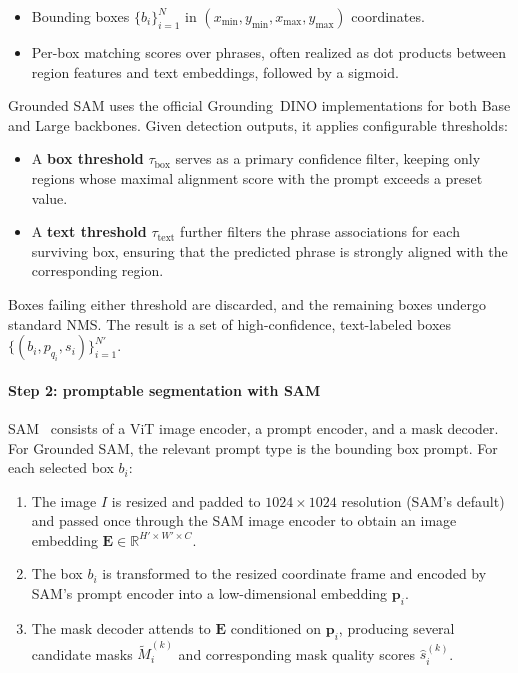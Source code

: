 \begin{enrichment}
\begin{enrichment}
		\begin{itemize}
			\item Bounding boxes $\{b_i\}_{i=1}^{N}$ in $(x_{\min}, y_{\min}, x_{\max}, y_{\max})$ coordinates.
			\item Per-box matching scores over phrases, often realized as dot products between region features and text embeddings, followed by a sigmoid.
		\end{itemize}
		
		Grounded SAM uses the official Grounding~DINO implementations for both Base and Large backbones.
		Given detection outputs, it applies configurable thresholds:
		
		\begin{itemize}
			\item A \textbf{box threshold} $\tau_{\text{box}}$ serves as a primary confidence filter, keeping only regions whose maximal alignment score with the prompt exceeds a preset value.
			\item A \textbf{text threshold} $\tau_{\text{text}}$ further filters the phrase associations for each surviving box, ensuring that the predicted phrase is strongly aligned with the corresponding region.
		\end{itemize}
		
		Boxes failing either threshold are discarded, and the remaining boxes undergo standard NMS.
		The result is a set of high-confidence, text-labeled boxes $\{(b_i, p_{q_i}, s_i)\}_{i=1}^{N'}$.
		
		\paragraph{Step 2: promptable segmentation with SAM}
		SAM~\cite{kirillov2023_sam} consists of a ViT image encoder, a prompt encoder, and a mask decoder.
		For Grounded SAM, the relevant prompt type is the bounding box prompt.
		For each selected box $b_i$:
		
		\begin{enumerate}
			\item The image $I$ is resized and padded to $1024\times1024$ resolution (SAM’s default) and passed once through the SAM image encoder to obtain an image embedding $\mathbf{E} \in \mathbb{R}^{H' \times W' \times C}$.
			\item The box $b_i$ is transformed to the resized coordinate frame and encoded by SAM’s prompt encoder into a low-dimensional embedding $\mathbf{p}_i$.
			\item The mask decoder attends to $\mathbf{E}$ conditioned on $\mathbf{p}_i$, producing several candidate masks $\tilde{M}_i^{(k)}$ and corresponding mask quality scores $\hat{s}_i^{(k)}$.
		\end{enumerate}
		

\end{enrichment}
\end{enrichment}
